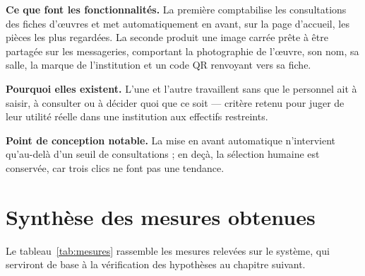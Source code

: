\textbf{Ce que font les fonctionnalités.} La première comptabilise les
consultations des fiches d'œuvres et met automatiquement en avant, sur la page
d'accueil, les pièces les plus regardées. La seconde produit une image carrée
prête à être partagée sur les messageries, comportant la photographie de
l'œuvre, son nom, sa salle, la marque de l'institution et un code QR renvoyant
vers sa fiche.

\textbf{Pourquoi elles existent.} L'une et l'autre travaillent sans que le
personnel ait à saisir, à consulter ou à décider quoi que ce soit — critère
retenu pour juger de leur utilité réelle dans une institution aux effectifs
restreints.

\textbf{Point de conception notable.} La mise en avant automatique n'intervient
qu'au-delà d'un seuil de consultations ; en deçà, la sélection humaine est
conservée, car trois clics ne font pas une tendance.

\section{Synthèse des mesures obtenues}

Le tableau~\ref{tab:mesures} rassemble les mesures relevées sur le système, qui
serviront de base à la vérification des hypothèses au chapitre suivant.

